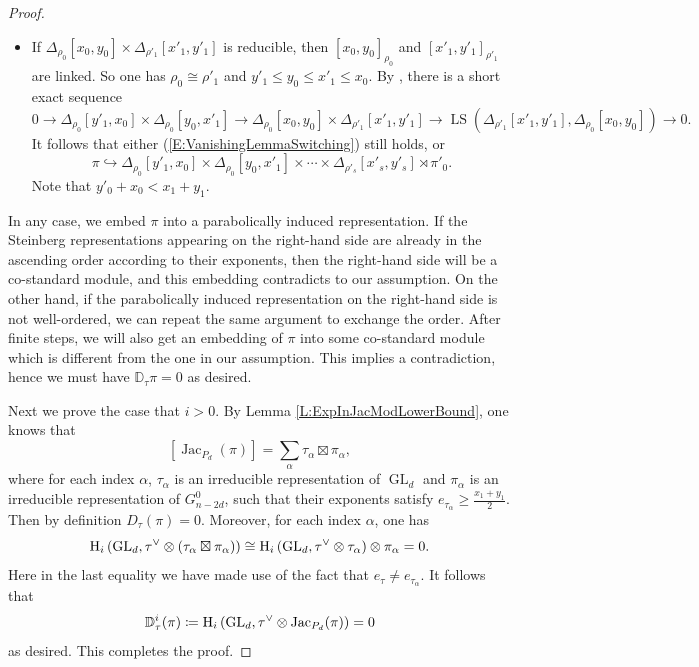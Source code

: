 \documentclass[11pt,letterpaper]{amsart}
\theoremstyle{plain}
\numberwithin{theorem}{section}
\numberwithin{equation}{subsection}
\theoremstyle{remark}
\newcommand{\GL}{\operatorname{GL}}
\newcommand{\Jac}{\operatorname{Jac}}
\newcommand{\LS}{\operatorname{LS}} %
\newcommand{\D}{\mathbb{D}}
\def\ra{\rightarrow}
\begin{document}
\begin{proof}
\begin{itemize}
    \item If $\Delta_{\rho_0}[x_0,y_0] \times \Delta_{\rho'_1}[x'_1,y'_1]$ is reducible, then $[x_0,y_0]_{\rho_0}$ and $[x'_1,y'_1]_{\rho'_1}$ are linked. So one has $\rho_0 \cong \rho'_1$ and $y'_1\leq y_0 \leq x'_1\leq x_0$. By \cite[Prop. 4.6]{ZeleII}, there is a short exact sequence
    \[
        0 \ra \Delta_{\rho_0}[y'_1,x_0]\times \Delta_{\rho_0}[y_0,x'_1] \ra \Delta_{\rho_0}[x_0,y_0] \times \Delta_{\rho'_1}[x'_1,y'_1] \ra \LS\left(\Delta_{\rho'_1}[x'_1,y'_1],\Delta_{\rho_0}[x_0,y_0]\right) \ra 0.
    \] 
    It follows that either (\ref{E:VanishingLemmaSwitching}) still holds, or 
    \[
        \pi\hookrightarrow \Delta_{\rho_0}[y'_1,x_0]\times \Delta_{\rho_0}[y_0,x'_1] \times \cdots \times \Delta_{\rho'_s}[x'_s,y'_s] \rtimes \pi'_{0}.
    \]
    Note that $y'_0+x_0<x_1+y_1$.
\end{itemize}
\vskip 5pt
In any case, we embed $\pi$ into a parabolically induced representation. If the Steinberg representations appearing on the right-hand side are already in the ascending order according to their exponents, then the right-hand side will be a co-standard module, and this embedding contradicts to our assumption. On the other hand, if the parabolically induced representation on the right-hand side is not well-ordered, we can repeat the same argument to exchange the order. After finite steps, we will also get an embedding of $\pi$ into some co-standard module which is different from the one in our assumption. This implies a contradiction, hence we must have $\D_{\tau}\pi = 0$ as desired.

\vskip 5pt

Next we prove the case that $i>0$. \fi%
By Lemma \ref{L:ExpInJacModLowerBound}, one knows that
\[
    \left[\Jac_{P_d}(\pi)\right] = \sum_\alpha \tau_\alpha\boxtimes\pi_\alpha,
\]
where for each index $\alpha$, $\tau_\alpha$ is an irreducible representation of $\GL_{d}$ and $\pi_\alpha$ is an irreducible representation of $G^0_{n-2d}$, such that their exponents satisfy $e_{\tau_\alpha}\geq \frac{x_1+y_1}{2}$. Then by definition $D_\tau(\pi)=0$. Moreover, for each index $\alpha$, one has
\[
    {\rm H}_i\left(\GL_d, \tau^\vee\otimes \left(\tau_\alpha\boxtimes\pi_\alpha\right)\right) \cong {\rm H}_i\left(\GL_d, \tau^\vee\otimes\tau_\alpha\right)\otimes\pi_\alpha =0.
\]
Here in the last equality we have made use of the fact that $e_\tau\neq e_{\tau_\alpha}$. It follows that
\[
    \D_\tau^i(\pi) \coloneqq {\rm H}_i\left(\GL_d, \tau^\vee\otimes \Jac_{P_d}(\pi)\right)=0
\]
as desired. This completes the proof.

\end{proof}
\end{document}
